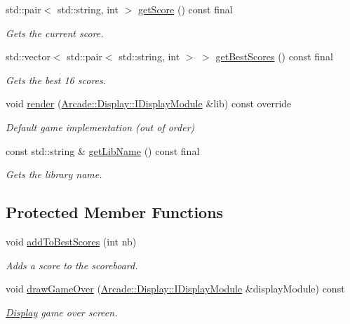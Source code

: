 \begin{DoxyCompactItemize}
std\+::pair$<$ std\+::string, int $>$ \mbox{\hyperlink{classArcade_1_1Games_1_1AGameModule_a83dbf1572ae5e25174bc7b81fed7ba77}{get\+Score}} () const final
\begin{DoxyCompactList}\small\item\em Gets the current score. \end{DoxyCompactList}\item 
std\+::vector$<$ std\+::pair$<$ std\+::string, int $>$ $>$ \mbox{\hyperlink{classArcade_1_1Games_1_1AGameModule_aaebba3bd5236f97cb18867fe99c7135b}{get\+Best\+Scores}} () const final
\begin{DoxyCompactList}\small\item\em Gets the best 16 scores. \end{DoxyCompactList}\item 
void \mbox{\hyperlink{classArcade_1_1Games_1_1AGameModule_a5897780d42d5faba3287c29b87f2b498}{render}} (\mbox{\hyperlink{classArcade_1_1Display_1_1IDisplayModule}{Arcade\+::\+Display\+::\+I\+Display\+Module}} \&lib) const override
\begin{DoxyCompactList}\small\item\em Default game implementation (out of order) \end{DoxyCompactList}\item 
const std\+::string \& \mbox{\hyperlink{classArcade_1_1Games_1_1AGameModule_a3245a3ba2eac74eadf5041bc3806ed6b}{get\+Lib\+Name}} () const final
\begin{DoxyCompactList}\small\item\em Gets the library name. \end{DoxyCompactList}\end{DoxyCompactItemize}
\subsection*{Protected Member Functions}
\begin{DoxyCompactItemize}
\item 
void \mbox{\hyperlink{classArcade_1_1Games_1_1AGameModule_a961c4a606bcc5d2ab1ead8b3c0bb3408}{add\+To\+Best\+Scores}} (int nb)
\begin{DoxyCompactList}\small\item\em Adds a score to the scoreboard. \end{DoxyCompactList}\item 
void \mbox{\hyperlink{classArcade_1_1Games_1_1AGameModule_ad3df1b3c8b78912656e5312e16a0dac5}{draw\+Game\+Over}} (\mbox{\hyperlink{classArcade_1_1Display_1_1IDisplayModule}{Arcade\+::\+Display\+::\+I\+Display\+Module}} \&display\+Module) const
\begin{DoxyCompactList}\small\item\em \mbox{\hyperlink{namespaceArcade_1_1Display}{Display}} game over screen. \end{DoxyCompactList}\end{DoxyCompactItemize}
